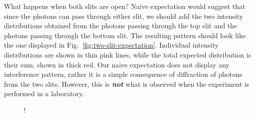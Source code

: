 What happens when both slits are open?
Naive expectation would suggest that since the photons can pass through either slit, we should add the two intensity distributions obtained from the photons passing through the top slit and the photons passing through the bottom slit.
The resulting pattern should look like the one displayed in Fig.~\ref{fig:two-slit-expectation}.
Individual intensity distributions are shown in thin pink lines, while the total expected distribution is their sum, shown in thick red.
Our naive expectation does not display any interference pattern, rather it is a simple consequence of diffraction of photons from the two slits.
However, this is \emph{\textbf{not}} what is observed when the experiment is performed in a laboratory.

\begin{figure}[H]
    \centering
    \resizebox {0.95\textwidth} {!} {
    }
\end{figure}
